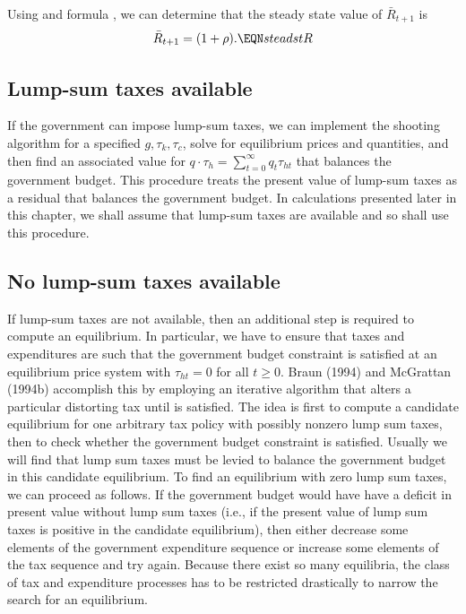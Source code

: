 Using  and formula , we can determine that the steady
state value of $\bar R_{t+1}$
is
$$ \bar R_{t+1} =  (1+\rho). \EQN steadstR $$

\subsection{Lump-sum taxes available}

If the government can  impose lump-sum taxes,  we
can implement the shooting algorithm for a specified $g, \tau_k,
 \tau_c$, solve for equilibrium prices and quantities,  and
then find an associated value for $q\cdot \tau_h =
 \sum_{t=0}^\infty q_t \tau_{ht}$   that balances the government budget.
This procedure treats
 the present value of lump-sum taxes as a residual that
balances the government budget.
In calculations presented later in this chapter,
we shall assume that lump-sum taxes are available and so shall use this
procedure.

\subsection{No lump-sum taxes available}
If lump-sum taxes are not available, then an additional step
is required to compute an equilibrium.  In particular,  we
have to ensure that taxes and expenditures are such that the
government budget constraint  is satisfied at an
equilibrium price system with $\tau_{ht} = 0 $ for all $t\geq 0$.
Braun (1994) and McGrattan (1994b) accomplish this by employing an
iterative algorithm that alters a particular distorting tax until
 is satisfied.  The idea is first to compute a candidate
equilibrium for one arbitrary tax policy with possibly nonzero lump sum taxes,  then to check whether
the government budget constraint is satisfied.  Usually we will find that lump sum taxes must be
levied to balance the government budget in this candidate equilibrium.  To find an equilibrium
with zero lump sum taxes, we can proceed as follows.  If the government
budget would have have a deficit   in present value without lump sum taxes (i.e., if the present value
of lump sum taxes is positive  in the candidate equilibrium), then either decrease some
elements of the government expenditure sequence or increase some
elements of the tax sequence and try again.  Because
there exist so many equilibria, the class of tax and expenditure
processes has to be restricted drastically  to narrow the search
for an equilibrium.




